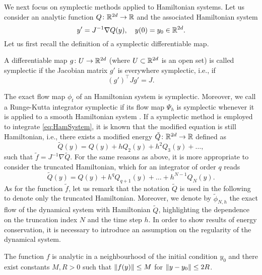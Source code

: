\documentclass[10pt]{article}
\begin{document}
We next focus on symplectic methods applied to Hamiltonian systems. Let us consider an analytic function $Q \colon \mathbb{R}^{2d} \to \mathbb{R}$ and the associated Hamiltonian system
\begin{equation}\label{eq:HamSystem}
y' = J^{-1}\nabla Q(y), \quad y(0) = y_0 \in \mathbb{R}^{2d}.
\end{equation}
Let us first recall the definition of a symplectic differentiable map.
\begin{definition} A differentiable map $g\colon U \to \mathbb{R}^{2d}$ (where $U\subset \mathbb{R}^{2d}$ is an open set) is called symplectic if the Jacobian matrix $g'$ is everywhere symplectic, i.e., if
\begin{equation}
	(g')^\top J g' = J.
\end{equation}	
\end{definition}
The exact flow map $\phi_t$ of an Hamiltonian system is symplectic. Moreover, we call a Runge-Kutta integrator symplectic if its flow map $\Psi_h$ is symplectic whenever it is applied to a smooth Hamiltonian system \cite{HLW06}. If a symplectic method is employed to integrate \eqref{eq:HamSystem}, it is known that the modified equation is still Hamiltonian, i.e., there exists a modified energy $\tilde Q \colon \mathbb{R}^{2d} \to \mathbb{R}$ defined as
\begin{equation}\label{eq:ModifiedHamiltonian}
\tilde Q(y) = Q(y) + h Q_2(y) + h^2 Q_3(y) + \ldots,
\end{equation}
such that $\tilde f = J^{-1}\nabla \tilde Q$. For the same reasons as above, it is more appropriate to consider the truncated Hamiltonian, which for an integrator of order $q$ reads
\begin{equation}\label{eq:ModifiedHamiltonianTrunc}
	\tilde Q(y) = Q(y) + h^q Q_{q+1}(y) + \ldots + h^{N-1} Q_N(y).
\end{equation}
As for the function $\tilde f$, let us remark that the notation $\tilde Q$ is used in the following to denote only the truncated Hamiltonian. Moreover, we denote by $\tilde \phi_{N, h}$ the exact flow of the dynamical system with Hamiltonian $\tilde Q$, highlighting the dependence on the truncation index $N$ and the time step $h$. In order to show results of energy conservation, it is necessary to introduce an assumption on the regularity of the dynamical system.

\begin{assumption}\label{as:RegHamiltonian} The function $f$ is analytic in a neighbourhood of the initial condition $y_0$ and there exist constants $M, R > 0$ such that $\lVert f(y)\rVert \leq M$ for $\lVert y - y_0\rVert \leq 2R$.
\end{assumption}
\end{document}
